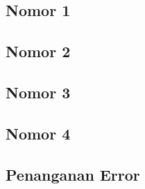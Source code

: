 	\subsection{Nomor 1}
		
		
	\subsection{Nomor 2}
		
	
	\subsection{Nomor 3}
		
	
	\subsection{Nomor 4}
		
		
	\subsection{Penanganan Error}
		
	